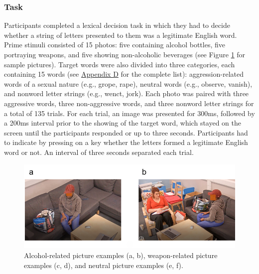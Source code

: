 \documentclass[serif, authordate, twocolumn, empirical]{jote-article}
\begin{document}
\subsubsection*{Task} Participants completed a lexical decision task in which they had to decide whether a string of letters presented to them was a legitimate English word. Prime stimuli consisted of 15 photos: five containing alcohol bottles, five portraying weapons, and five showing non-alcoholic beverages (see Figure \ref{fig:fig1} for sample pictures). Target words were also divided into three categories, each containing 15 words (see \hyperlink{D}{Appendix D}  for the complete list): aggression-related words of a sexual nature (e.g., grope, rape), neutral words (e.g., observe, vanish), and nonword letter strings (e.g., wenct, jork). Each photo was paired with three aggressive words, three non-aggressive words, and three nonword letter strings for a total of 135 trials. For each trial, an image was presented for 300ms, followed by a 200ms interval prior to the showing of the target word, which stayed on the screen until the participants responded or up to three seconds. Participants had to indicate by pressing on a key whether the letters formed a legitimate English word or not. An interval of three seconds separated each trial.
\begin{figure}[]
	\centering
	\includegraphics[width=\columnwidth, trim={15px 0 0 0}]{media/image1.png}
	\caption{Alcohol-related picture examples (a, b), weapon-related picture examples (c, d), and neutral picture examples (e, f).}
	\label{fig:fig1}
\end{figure}

{}
\end{document}
